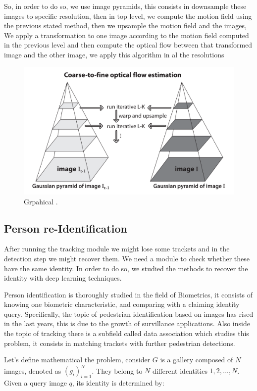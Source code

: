 \documentclass[12pt, a4paper, titlepage,twoside,openright]{article}
\begin{document}
So, in order to do so, we use image pyramids, this consists in downsample these images to specific resolution, then in top level, we compute the motion field using the previous stated method, then 
we upsample the motion field and the images, We apply a transformation to one image according to the motion field computed in the previous level and then compute the optical flow between that 
transformed image and the other image, we apply this algorithm in al the resolutions



\begin{figure}[H]
\centering         
\includegraphics[width=0.6\linewidth]{lucasKanade/piram.png}
\caption{Grpahical .} \label{corner}
\end{figure}



\subsection{Person re-Identification}\label{misMatch}


After running the tracking module we might lose some trackets and in the detection step we might recover them. We need a module to check whether these have the same identity. In order to do so, we studied the methods to recover the identity with deep learning techniques.

Person identification is thoroughly studied in the field of Biometrics, it consists of  knowing one biometric characteristic, and comparing with a claiming identity query. Specifically, the topic of pedestrian identification based on images has rised in the last years, this is due to the growth of survillance applications. Also inside the topic of tracking there is a subfield called data association which studies this problem, it consists in matching trackets with further pedestrian detections.

Let's define mathematical the problem, consider $G$ is a gallery composed of $N$ images, denoted as $(g_{i})_{i=1}^{N}$. They belong to $N$ different identities $ 1,2,...,N $. Given a query image $q$, its identity is determined by:
\end{document}
